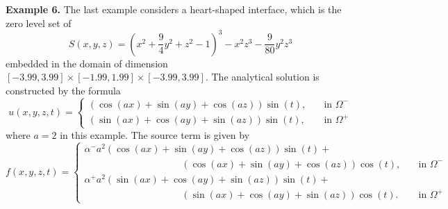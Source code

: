 \documentclass[dissertation]{uathesis}
\begin{document}
\begin{body}
{\flushleft \bf Example 6.} The last example considers a heart-shaped interface,
which is the zero level set of 
%
\begin{equation}
S(x,y,z) = (x^{2}+\frac{9}{4}y^{2}+z^{2}-1)^{3}-x^{2}z^{3}-\frac{9}{80}y^{2}z^{3}
\end{equation}
%
embedded in the domain of dimension $[-3.99,3.99]\times[-1.99,1.99]\times[-3.99,3.99]$. The analytical solution is constructed by the formula
% 
\begin{equation} \label{analytical_eqn_3} 
u(x,y,z,t)= 
\begin{cases}
(\cos(ax)+\sin(ay)+\cos(az))\sin(t), \quad   &\mbox{in } \Omega^{-} \\
(\sin(ax)+\cos(ay)+\sin(az))\sin(t), \quad   &\mbox{in } \Omega^{+}
\end{cases}
\end{equation}
%
where $a=2$ in this example. The source term is given by
% 
\begin{equation} 
f(x,y,z,t)= 
\begin{cases}
\alpha^{-} a^{2}(\cos(ax)+\sin(ay)+\cos(az))\sin(t)+ \\
\quad \quad \quad \quad \quad \quad \quad \quad \quad \quad (\cos(ax)+\sin(ay)+\cos(az))\cos(t), \quad   &\mbox{in } \Omega^{-} \\
\alpha^{+} a^{2}(\sin(ax)+\cos(ay)+\sin(az))\sin(t)+ \\
\quad \quad \quad \quad \quad \quad \quad \quad \quad \quad (\sin(ax)+\cos(ay)+\sin(az))\cos(t). \quad    &\mbox{in } \Omega^{+}
\end{cases}
\end{equation}
\label{source_eqn_3}
%


\end{body}
\end{document}
